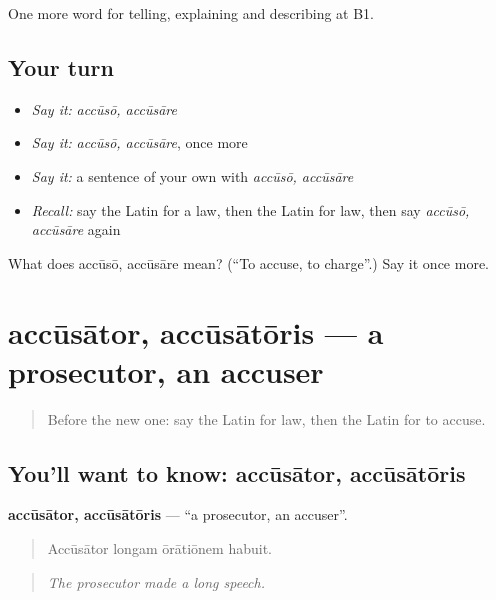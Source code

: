 \begin{grammarlens}[title={What you've built}]
One more word for telling, explaining and describing at B1.
\end{grammarlens}

\subsection*{Your turn}
\begin{itemize}
\raggedright
  \item \emph{Say it:} \emph{accūsō, accūsāre}
  \item \emph{Say it:} \emph{accūsō, accūsāre}, once more
  \item \emph{Say it:} a sentence of your own with \emph{accūsō, accūsāre}
  \item \emph{Recall:} say the Latin for a law, then the Latin for law, then say \emph{accūsō, accūsāre} again
\end{itemize}

\begin{tcolorbox}[breakable,colback=teal!4,colframe=teal!35!black,title={Before you move on}]
What does accūsō, accūsāre mean? (\textquotedblleft{}To accuse, to charge\textquotedblright{}.) Say it once more.
\end{tcolorbox}
\section[accūsātor, accūsātōris]{accūsātor, accūsātōris — a prosecutor, an accuser}

\label{lesson:LA-C309-accusator}



\begin{quote}
Before the new one: say the Latin for law, then the Latin for to accuse.
\end{quote}

\subsection*{You'll want to know: accūsātor, accūsātōris}
\textbf{accūsātor, accūsātōris} — \textquotedblleft{}a prosecutor, an accuser\textquotedblright{}.

\begin{quote}
Accūsātor longam ōrātiōnem habuit.
\end{quote}

\begin{quote}
\emph{The prosecutor made a long speech.}
\end{quote}

